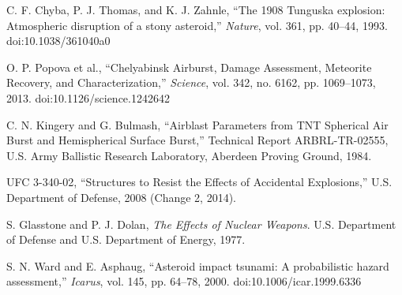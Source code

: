 \documentclass[conference]{IEEEtran}
\begin{document}
\begin{thebibliography}{00}
    C. F. Chyba, P. J. Thomas, and K. J. Zahnle, ``The 1908 Tunguska explosion: Atmospheric disruption of a stony asteroid,'' \textit{Nature}, vol. 361, pp. 40--44, 1993. doi:10.1038/361040a0

    O. P. Popova et al., ``Chelyabinsk Airburst, Damage Assessment, Meteorite Recovery, and Characterization,'' \textit{Science}, vol. 342, no. 6162, pp. 1069--1073, 2013. doi:10.1126/science.1242642

    C. N. Kingery and G. Bulmash, ``Airblast Parameters from TNT Spherical Air Burst and Hemispherical Surface Burst,'' Technical Report ARBRL-TR-02555, U.S. Army Ballistic Research Laboratory, Aberdeen Proving Ground, 1984.

    UFC 3-340-02, ``Structures to Resist the Effects of Accidental Explosions,'' U.S. Department of Defense, 2008 (Change 2, 2014).

    S. Glasstone and P. J. Dolan, \textit{The Effects of Nuclear Weapons}. U.S. Department of Defense and U.S. Department of Energy, 1977.

    S. N. Ward and E. Asphaug, ``Asteroid impact tsunami: A probabilistic hazard assessment,'' \textit{Icarus}, vol. 145, pp. 64--78, 2000. doi:10.1006/icar.1999.6336

\end{thebibliography}
\end{document}
